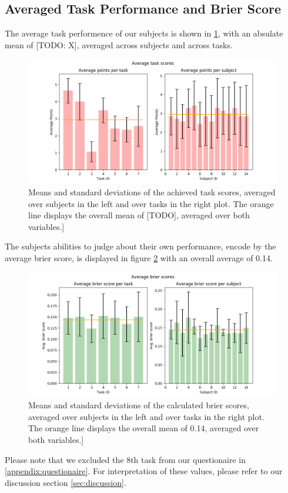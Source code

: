 \documentclass[../main/main.tex]{subfiles}
\begin{document}
\subsection{Averaged Task Performance and Brier Score}
The average task performence of our subjects is shown in \ref{fig:avg_scores}, with an absulate mean of [TODO: X], averaged across subjects and across tasks. 
\begin{figure}[h]
	\centering
	\captionsetup{justification=centering}
	\label{fig:avg_scores}
	\includegraphics[width=\textwidth]{../assets/average_task_scores.png}
	\caption{Means and standard deviations of the achieved task scores, averaged over subjects in the left and over tasks in the right plot. The orange line displays the overall mean of [TODO], averaged over both variables.]}
\end{figure}
The subjects abilities to judge about their own performance, encode by the average brier score, is displayed in figure \ref{fig:avg_brier} with an overall average of 0.14. 
\begin{figure}[h]
	\centering
	\captionsetup{justification=centering}
	\label{fig:avg_brier}
	\includegraphics[width=\textwidth]{../assets/average_brier_scores.png}
	\caption{Means and standard deviations of the calculated brier scores, averaged over subjects in the left and over tasks in the right plot. The orange line displays the overall mean of 0.14, averaged over both variables.]} 
\end{figure}
Please note that we excluded the 8th task from our questionaire in \ref{appendix:questionaire}. For interpretation of these values, please refer to our discussion section \ref{sec:discussion}.
\end{document}
